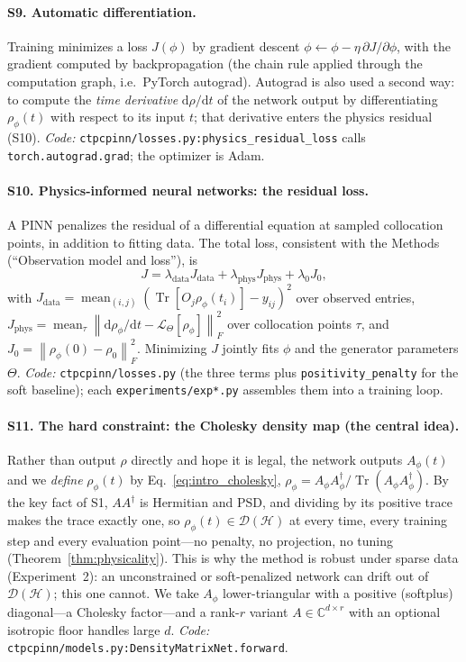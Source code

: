 \documentclass[11pt]{article}
\DeclareMathOperator{\Tr}{Tr}
\newcommand{\C}{\mathbb{C}}
\newcommand{\calD}{\mathcal{D}}
\newcommand{\calL}{\mathcal{L}}
\newcommand{\dd}{\mathrm{d}}
\newcommand{\norm}[1]{\left\lVert #1 \right\rVert}
\newcommand{\hilb}{\mathcal{H}}
\newcommand{\rhophi}{\rho_{\phi}}
\begin{document}
\paragraph{S9. Automatic differentiation.}
Training minimizes a loss $J(\phi)$ by gradient descent $\phi\leftarrow\phi-\eta\,\partial J/\partial\phi$, with the gradient computed by backpropagation (the chain rule applied through the computation graph, i.e.\ PyTorch autograd). Autograd is also used a second way: to compute the \emph{time derivative} $\dd\rho/\dd t$ of the network output by differentiating $\rhophi(t)$ with respect to its input $t$; that derivative enters the physics residual (S10). \emph{Code:} \texttt{ctpcpinn/losses.py:physics\_residual\_loss} calls \texttt{torch.autograd.grad}; the optimizer is Adam.

\paragraph{S10. Physics-informed neural networks: the residual loss.}
A PINN penalizes the residual of a differential equation at sampled collocation points, in addition to fitting data. The total loss, consistent with the Methods (``Observation model and loss''), is
\begin{equation*}
J=\lambda_{\mathrm{data}}J_{\mathrm{data}}+\lambda_{\mathrm{phys}}J_{\mathrm{phys}}+\lambda_0 J_0,
\end{equation*}
with $J_{\mathrm{data}}=\operatorname{mean}_{(i,j)}(\Tr[O_j\rhophi(t_i)]-y_{ij})^2$ over observed entries, $J_{\mathrm{phys}}=\operatorname{mean}_\tau\norm{\dd\rhophi/\dd t-\calL_\Theta[\rhophi]}_F^2$ over collocation points $\tau$, and $J_0=\norm{\rhophi(0)-\rho_0}_F^2$. Minimizing $J$ jointly fits $\phi$ and the generator parameters $\Theta$. \emph{Code:} \texttt{ctpcpinn/losses.py} (the three terms plus \texttt{positivity\_penalty} for the soft baseline); each \texttt{experiments/exp*.py} assembles them into a training loop.

\paragraph{S11. The hard constraint: the Cholesky density map (the central idea).}
Rather than output $\rho$ directly and hope it is legal, the network outputs $A_\phi(t)$ and we \emph{define} $\rhophi(t)$ by Eq.~\eqref{eq:intro_cholesky}, $\rhophi=A_\phi A_\phi^\dagger/\Tr(A_\phi A_\phi^\dagger)$. By the key fact of S1, $A A^\dagger$ is Hermitian and PSD, and dividing by its positive trace makes the trace exactly one, so $\rhophi(t)\in\calD(\hilb)$ at every time, every training step and every evaluation point---no penalty, no projection, no tuning (Theorem~\ref{thm:physicality}). This is why the method is robust under sparse data (Experiment~2): an unconstrained or soft-penalized network can drift out of $\calD(\hilb)$; this one cannot. We take $A_\phi$ lower-triangular with a positive (softplus) diagonal---a Cholesky factor---and a rank-$r$ variant $A\in\C^{d\times r}$ with an optional isotropic floor handles large $d$. \emph{Code:} \texttt{ctpcpinn/models.py:DensityMatrixNet.forward}.
\end{document}
